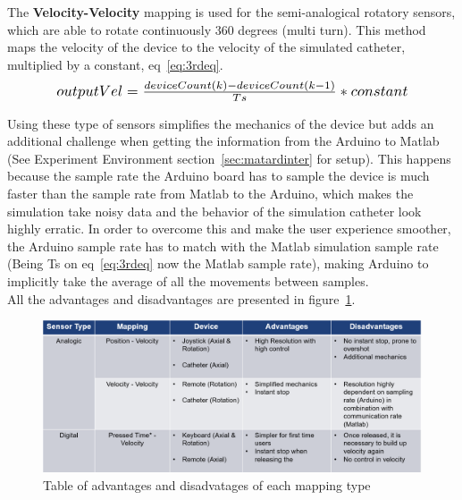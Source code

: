 The \textbf{Velocity-Velocity} mapping is used for the semi-analogical rotatory sensors, which are able to rotate continuously 360 degrees (multi turn). This method maps the velocity of the device to the velocity of the simulated catheter, multiplied by a constant, eq~\ref{eq:3rdeq}.\\

\begin{equation}
   \scalebox{1.2}{$outputVel=\frac{deviceCount(k)-deviceCount(k-1)}{Ts}*constant$}
   \centering
   \label{eq:3rdeq}
\end{equation}

Using these type of sensors simplifies the mechanics of the device but adds an additional challenge when getting the information from the Arduino to Matlab (See Experiment Environment section~\ref{sec:matardinter} for setup). This happens because the sample rate the Arduino board has to sample the device is much faster than the sample rate from Matlab to the Arduino, which makes the simulation take noisy data and the behavior of the simulation catheter look highly erratic. In order to overcome this and make the user experience smoother, the Arduino sample rate has to match with the Matlab simulation sample rate (Being Ts on eq~\ref{eq:3rdeq} now the Matlab sample rate), making Arduino to implicitly take the average of all the movements between samples.\\

All the advantages and disadvantages are presented in figure~\ref{img:adtable}.\\

\begin{figure}[ht]
   \centering
   \includegraphics[width=1.0\textwidth]{img/adtable.PNG}
   \caption{Table of advantages and disadvatages of each mapping type}
   \label{img:adtable}
\end{figure}
